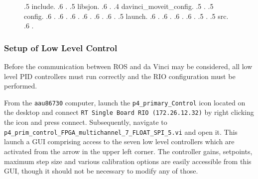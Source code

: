 \begin{figure}[H]
{.5 include.
.6 \color{gray}{... header files for davinci\_driver.cpp and sbrio\_driver.cpp}.
.5 libsjon.
.6 \color{gray}{... various libraries}.
.4 davinci\_moveit\_config. %
.5 \color{ForestGreen}{CMakeLists.txt}.
.5 config.
.6 \color{ForestGreen}{controllers.yaml}\hspace{0.2cm}\color{gray}{\# specifies each controllable joint}.
.6 \color{ForestGreen}{davinci.srdf}\hspace{0.2cm}\color{gray}{\# collision and group specification}.
.6 \color{ForestGreen}{fake\_controllers.yaml}\hspace{0.2cm}\color{gray}{\# simulation controller specification}.
.6 \color{ForestGreen}{joint\_limits.yaml}\hspace{0.2cm}\color{gray}{\# Acceleration, velocity and position limits}.
.6 \color{ForestGreen}{kinematics.yaml}\hspace{0.2cm}\color{gray}{\# Kinematic solver specification}.
.6 \color{ForestGreen}{ompl\_planning.yaml}\hspace{0.2cm}\color{gray}{\# path planning specification}. 	
.5 launch.
.6 \color{ForestGreen}{davinci\_moveit\_controller\_manager.launch.xml}\hspace{0.2cm}\color{gray}{}.
.6 \color{ForestGreen}{move\_group.launch}\hspace{0.2cm}\color{gray}{\# launch all essential drivers }.
.6 \color{ForestGreen}{setup\_assistant.launch}\hspace{0.2cm}\color{gray}{\# launch to generate essential moveit files}.
.6 \color{gray}{... + other launch files controlled by the setup assistant}.
.5 \color{ForestGreen}{package.xml}\hspace{0.2cm}\color{gray}{\# specification of moveit dependencies}.
.5 src.
.6 \color{ForestGreen}{MoveGroupInterface.cpp}\hspace{0.2cm}\color{gray}{\# main C++ interface}.
}
\end{figure}


\subsubsection*{Setup of Low Level Control}
Before the communication between ROS and da Vinci may be considered, all low level PID controllers must run correctly and the RIO configuration must be performed. 

From the \texttt{aau86730} computer, launch the \texttt{p4\_primary\_Control} icon located on the desktop and connect \texttt{RT Single Board RIO (172.26.12.32)} by right clicking the icon and press connect. Subsequently, navigate to \texttt{p4\_prim\_control\_FPGA\_multichannel\_7\_FLOAT\_SPI\_5.vi} and open it. This launch a GUI comprising access to the seven low level controllers which are activated from the arrow in the upper left corner. The controller gains, setpoints, maximum step size and various calibration options are easily accessible from this GUI, though it should not be necessary to modify any of those. 

